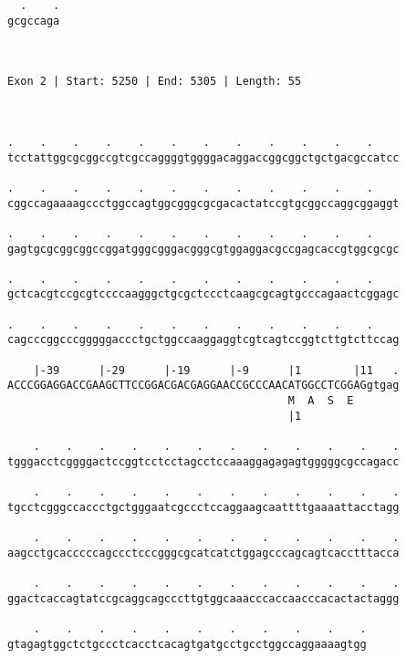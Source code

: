 \documentclass{article}
\begin{document}
\begin{Verbatim}
  .    .
gcgccaga
        
        
 
Exon 2 | Start: 5250 | End: 5305 | Length: 55



.    .    .    .    .    .    .    .    .    .    .    .    
tcctattggcgcggccgtcgccaggggtggggacaggaccggcggctgctgacgccatcc
                                                            
.    .    .    .    .    .    .    .    .    .    .    .    
cggccagaaaagccctggccagtggcgggcgcgacactatccgtgcggccaggcggaggt
                                                            
.    .    .    .    .    .    .    .    .    .    .    .    
gagtgcgcggcggccggatgggcgggacgggcgtggaggacgccgagcaccgtggcgcgc
                                                            
.    .    .    .    .    .    .    .    .    .    .    .    
gctcacgtccgcgtccccaagggctgcgctccctcaagcgcagtgcccagaactcggagc
                                                            
.    .    .    .    .    .    .    .    .    .    .    .    
cagcccggcccgggggaccctgctggccaaggaggtcgtcagtccggtcttgtcttccag
                                                            
    |-39      |-29      |-19      |-9      |1        |11   .
ACCCGGAGGACCGAAGCTTCCGGACGACGAGGAACCGCCCAACATGGCCTCGGAGgtgag
                                           M  A  S  E       
                                           |1               
  
    .    .    .    .    .    .    .    .    .    .    .    .
tgggacctcggggactccggtcctcctagcctccaaaggagagagtgggggcgccagacc
                                                            
    .    .    .    .    .    .    .    .    .    .    .    .
tgcctcgggccaccctgctgggaatcgccctccaggaagcaattttgaaaattacctagg
                                                            
    .    .    .    .    .    .    .    .    .    .    .    .
aagcctgcacccccagccctcccgggcgcatcatctggagcccagcagtcacctttacca
                                                            
    .    .    .    .    .    .    .    .    .    .    .    .
ggactcaccagtatccgcaggcagcccttgtggcaaacccaccaacccacactactaggg
                                                            
    .    .    .    .    .    .    .    .    .    .    .
gtagagtggctctgccctcacctcacagtgatgcctgcctggccaggaaaagtgg
                                                       

\end{Verbatim}
\end{document}
